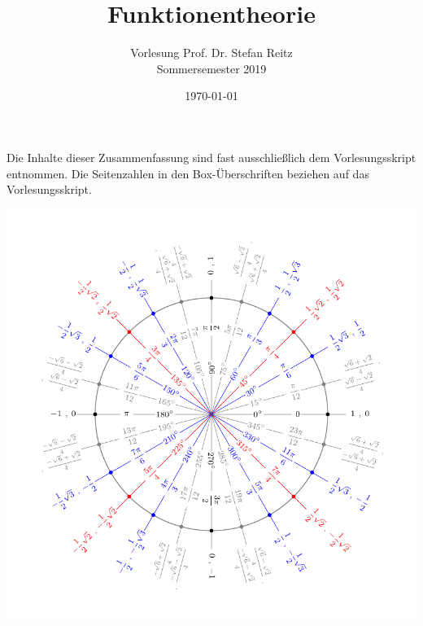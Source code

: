 \documentclass[
	fontsize=7pt,
	a4paper,
	numbers=noenddot,
]{scrartcl}
\title{Funktionentheorie}
\subtitle{Vorlesung Prof. Dr. Stefan Reitz\\Sommersemester 2019}
\author{\autor}
\date{\today}
\numberwithin{equation}{section}
\begin{document}
	\maketitle
	Die Inhalte dieser Zusammenfassung sind fast ausschließlich dem Vorlesungsskript entnommen.
	Die Seitenzahlen in den Box-Überschriften beziehen auf das Vorlesungsskript.\\
	\begin{minipage}{\linewidth}
	  \centering
	  \includegraphics[width=\linewidth]{content/figures/einheitskreis_15}
	\end{minipage}
	\newpage
	\tableofcontents
	\newpage
	
	\pagebreak
	
	
	
	
	
	
	
	
\end{document}
